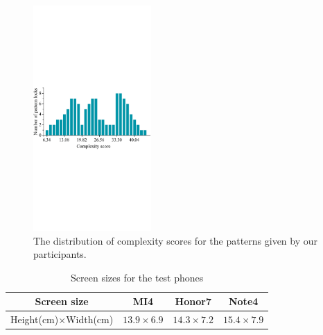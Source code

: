         \begin{figure}[!t]
            \centering
            \includegraphics[width=0.4\textwidth]{fig/pattern-strength.pdf}
            \vspace{-3mm}
            \caption{The distribution of complexity scores for the patterns given by our participants.}
            \vspace{-3mm}
            \label{fig:pattern-strength}
        \end{figure}

    \begin{table}[!t]
            \centering
            \caption{Screen sizes for the test phones}
            \label{tab:locking-screen-size}
            \small
            \begin{tabular}{cccc}
                \toprule
                \textbf{Screen size} & \textbf{MI4} & \textbf{Honor7} & \textbf{Note4} \\
                \midrule
                Height(cm)$\times$Width(cm) & $13.9\times6.9$ & $14.3\times7.2$ & $15.4\times7.9$ \\
                \bottomrule
            \end{tabular}
            \vspace{-4mm}
    \end{table}


